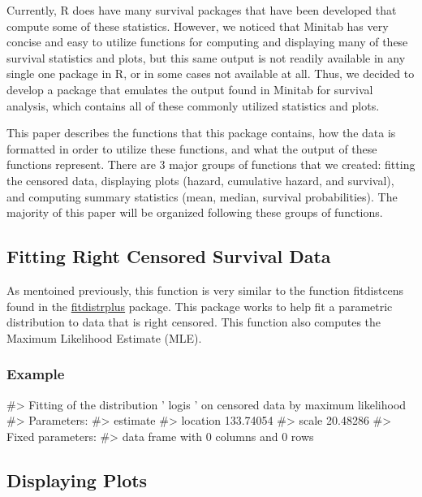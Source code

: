 Currently, R does have many survival packages that have been developed
that compute some of these statistics. However, we noticed that Minitab
has very concise and easy to utilize functions for computing and
displaying many of these survival statistics and plots, but this same
output is not readily available in any single one package in R, or in
some cases not available at all. Thus, we decided to develop a package
that emulates the output found in Minitab for survival analysis, which
contains all of these commonly utilized statistics and plots.

This paper describes the functions that this package contains, how the
data is formatted in order to utilize these functions, and what the
output of these functions represent. There are 3 major groups of
functions that we created: fitting the censored data, displaying plots
(hazard, cumulative hazard, and survival), and computing summary
statistics (mean, median, survival probabilities). The majority of this
paper will be organized following these groups of functions.

\hypertarget{fitting-right-censored-survival-data}{%
\subsection{Fitting Right Censored Survival
Data}\label{fitting-right-censored-survival-data}}

As mentoined previously, this function is very similar to the function
fitdistcens found in the
\href{https://cran.r-project.org/web/packages/fitdistrplus/index.html}{fitdistrplus}
package. This package works to help fit a parametric distribution to
data that is right censored. This function also computes the Maximum
Likelihood Estimate (MLE).

\hypertarget{example}{%
\subsubsection{Example}\label{example}}

\begin{Schunk}
\begin{Soutput}
#> Fitting of the distribution ' logis ' on censored data by maximum likelihood 
#> Parameters:
#>           estimate
#> location 133.74054
#> scale     20.48286
#> Fixed parameters:
#> data frame with 0 columns and 0 rows
\end{Soutput}
\end{Schunk}

\hypertarget{displaying-plots}{%
\subsection{Displaying Plots}\label{displaying-plots}}

